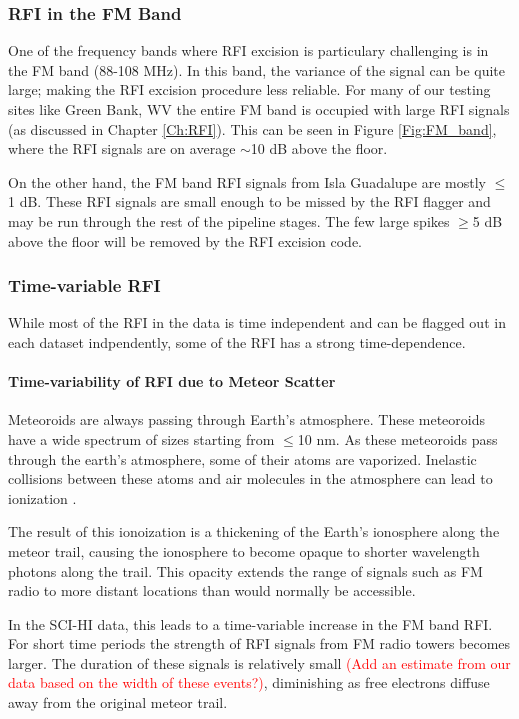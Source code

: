 \subsubsection{RFI in the FM Band}

One of the frequency bands where RFI excision is particulary challenging is in the FM band (88-108 MHz). In this band, the variance of the signal can be quite large; making the RFI excision procedure less reliable. For many of our testing sites like Green Bank, WV the entire FM band is occupied with large RFI signals (as discussed in Chapter \ref{Ch:RFI}). This can be seen in Figure \ref{Fig:FM_band}, where the RFI signals are on average $\sim$10 dB above the floor. 

On the other hand, the FM band RFI signals from Isla Guadalupe are mostly $\leq$1 dB. These RFI signals are small enough to be missed by the RFI flagger and may be run through the rest of the pipeline stages. The few large spikes $\geq$5 dB above the floor will be removed by the RFI excision code. 

\subsubsection{Time-variable RFI}

While most of the RFI in the data is time independent and can be flagged out in each dataset indpendently, some of the RFI has a strong time-dependence. 

\paragraph{Time-variability of RFI due to Meteor Scatter}

Meteoroids are always passing through Earth's atmosphere. These meteoroids have a wide spectrum of sizes starting from $\leq$10 nm. As these meteoroids pass through the earth's atmosphere, some of their atoms are vaporized. Inelastic collisions between these atoms and air molecules in the atmosphere can lead to ionization \cite{meteor_review}. 

The result of this ionoization is a thickening of the Earth's ionosphere along the meteor trail, causing the ionosphere to become opaque to shorter wavelength photons along the trail. This opacity extends the range of signals such as FM radio to more distant locations than would normally be accessible.

In the SCI-HI data, this leads to a time-variable increase in the FM band RFI. For short time periods the strength of RFI signals from FM radio towers becomes larger. The duration of these signals is relatively small \textcolor{red}{(Add an estimate from our data based on the width of these events?)}, diminishing as free electrons diffuse away from the original meteor trail. 

